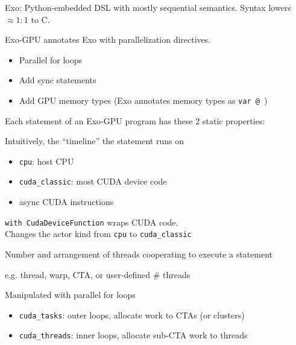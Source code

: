 \begin{minipage}[t]{0.48\textwidth}\fixminipage

Exo: Python-embedded DSL with mostly sequential semantics.
Syntax lowers $\approx 1:1$ to C.

Exo-GPU annotates Exo with parallelization directives.


\begin{itemize}
  \item Parallel for loops
  \item Add sync statements
  \item Add GPU memory types (Exo annotates memory types as \texttt{var @ })
\end{itemize}
\end{minipage}
\hfill
\begin{minipage}[t]{0.48\textwidth}\fixminipage

Each statement of an Exo-GPU program has these 2 static properties:


Intuitively, the ``timeline'' the statement runs on
\begin{itemize}
  \item \texttt{cpu}: host CPU
  \item \texttt{cuda\_classic}: most CUDA device code
  \item async CUDA instructions
\end{itemize}
\texttt{with CudaDeviceFunction} wraps CUDA code.\\
Changes the actor kind from \texttt{cpu} to \texttt{cuda\_classic}


Number and arrangement of threads cooperating to execute a statement

e.g. thread, warp, CTA, or user-defined \# threads

Manipulated with parallel for loops

\begin{itemize}
  \item \texttt{cuda\_tasks}: outer loops, allocate work to CTAs (or clusters)
  \item \texttt{cuda\_threads}: inner loops, allocate sub-CTA work to threads
\end{itemize}
\end{minipage}


